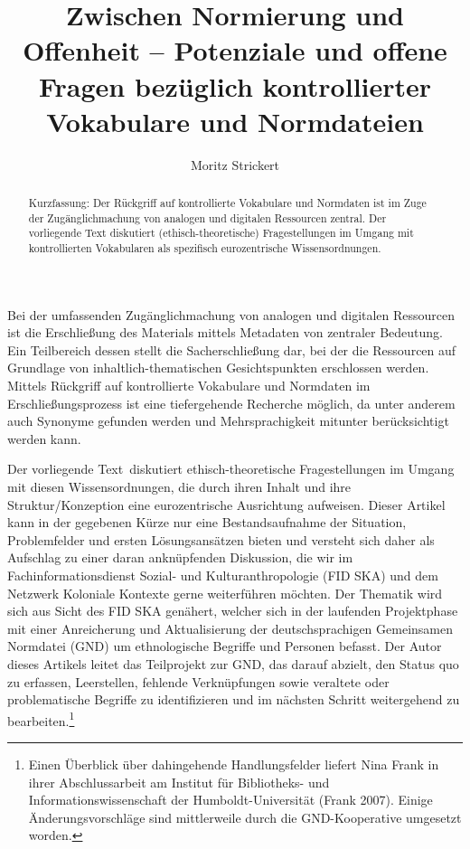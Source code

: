 \documentclass[a4paper,
fontsize=11pt,
oneside,
numbers=noperiodatend,
parskip=half-,
bibliography=totoc,
final
]{scrartcl}
\title{\LARGE{Zwischen Normierung und Offenheit -- Potenziale und offene Fragen bezüglich kontrollierter Vokabulare und Normdateien}}%
\author{Moritz Strickert} %
\date{}
\begin{document}
\maketitle
\thispagestyle{fancyplain} 

\begin{abstract}
\noindent
Kurzfassung: Der Rückgriff auf kontrollierte Vokabulare und Normdaten
ist im Zuge der Zugänglichmachung von analogen und digitalen Ressourcen
zentral. Der vorliegende Text diskutiert (ethisch-theoretische)
Fragestellungen im Umgang mit kontrollierten Vokabularen als spezifisch
eurozentrische Wissensordnungen.
\end{abstract}

Bei der umfassenden Zugänglichmachung von analogen und digitalen
Ressourcen ist die Erschließung des Materials mittels Metadaten von
zentraler Bedeutung. Ein Teilbereich dessen stellt die Sacherschließung
dar, bei der die Ressourcen auf Grundlage von inhaltlich-thema\-tischen
Gesichtspunkten erschlossen werden. Mittels Rückgriff auf kontrollierte
Vokabulare und Normdaten im Erschließungsprozess ist eine tiefergehende
Recherche möglich, da unter anderem auch Synonyme gefunden werden und
Mehrsprachigkeit mitunter berücksichtigt werden kann.

Der vorliegende Text~diskutiert ethisch-theoretische Fragestellungen im
Umgang mit diesen Wissensordnungen, die durch ihren Inhalt und ihre
Struktur/Konzeption eine eurozentrische Ausrichtung aufweisen. Dieser
Artikel kann in der gegebenen Kürze nur eine Bestandsaufnahme der
Situation, Problemfelder und ersten Lösungsansätzen bieten und versteht
sich daher als Aufschlag zu einer daran anknüpfenden Diskussion, die wir
im Fachinformationsdienst Sozial- und Kulturanthropologie (FID SKA) und
dem Netzwerk Koloniale Kontexte gerne weiterführen möchten. Der Thematik
wird sich aus Sicht des FID SKA genähert, welcher sich in der laufenden
Projektphase mit einer Anreicherung und Aktualisierung der
deutschsprachigen Gemeinsamen Normdatei (GND) um ethnologische Begriffe
und Personen befasst. Der Autor dieses Artikels leitet das Teilprojekt
zur GND, das darauf abzielt, den Status quo zu erfassen, Leerstellen,
fehlende Verknüpfungen sowie veraltete oder problematische Begriffe zu
identifizieren und im nächsten Schritt weitergehend zu
bearbeiten.\footnote{Einen Überblick über dahingehende Handlungsfelder
  liefert Nina Frank in ihrer Abschlussarbeit am Institut für
  Bibliotheks- und Informationswissenschaft der Humboldt-Universität
  (Frank 2007). Einige Änderungsvorschläge sind mittlerweile durch die
  GND-Kooperative umgesetzt worden.}
\end{document}
